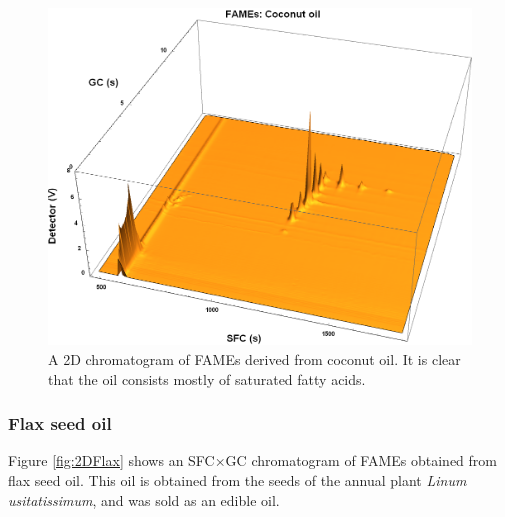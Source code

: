 \begin{figure}
\centering
\includegraphics[width=\textwidth]{Figures/Coconut.png}
\decoRule

\caption[SFC×GC of coconut oil]{A 2D chromatogram of FAMEs derived from
coconut oil. It is clear that the oil consists mostly of saturated fatty
acids.}

\label{fig:2DCoconut}
\end{figure}

\subsubsection{Flax seed oil}

Figure \ref{fig:2DFlax} shows an SFC×GC chromatogram of FAMEs obtained from flax
seed oil. This oil is obtained from the seeds of the annual plant \textit{Linum
usitatissimum}, and was sold as an edible oil.

